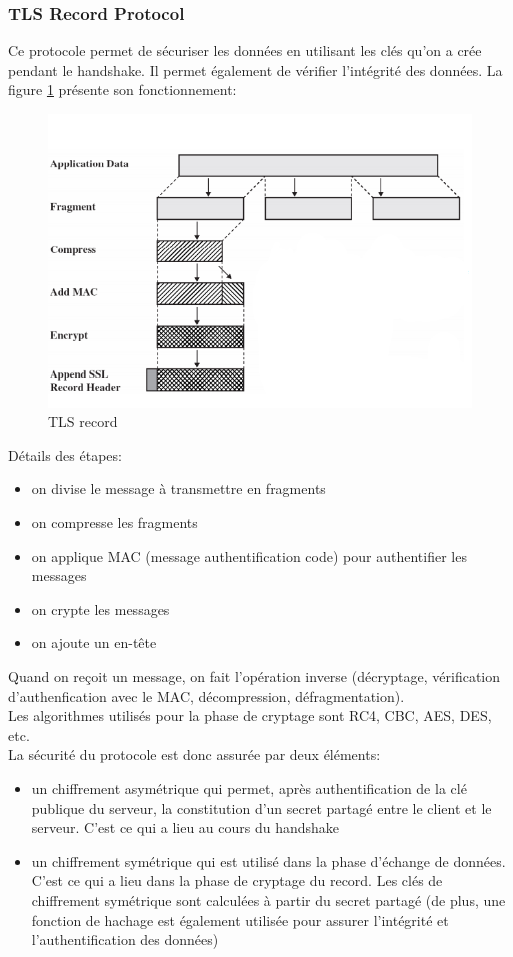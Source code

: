 \subsubsection{TLS Record Protocol}

Ce protocole permet de sécuriser les données en utilisant les clés qu'on a crée pendant le handshake. Il permet également de vérifier l'intégrité des données. La figure \ref{record} présente son fonctionnement:
\begin{figure}[H]
\centering
\includegraphics[scale=0.7]{img/tls-record.png}
\caption{TLS record}
\label{record}
\end{figure}

Détails des étapes:
\begin{itemize}
\item on divise le message à transmettre en fragments 
\item on compresse les fragments
\item on applique MAC (message authentification code) pour authentifier les messages 
\item on crypte les messages
\item on ajoute un en-t\^ete
\end{itemize}
Quand on reçoit un message, on fait l'opération inverse (décryptage, vérification d'authenfication avec le MAC, décompression, défragmentation). \\
Les algorithmes utilisés pour la phase de cryptage sont RC4, CBC, AES, DES, etc. \\

La sécurité du protocole est donc assurée par deux éléments:
\begin{itemize}
\item un chiffrement asymétrique qui permet, après authentification de la clé publique du serveur, la constitution d'un secret partagé entre le client et le serveur. C'est ce qui a lieu au cours du handshake
\item un chiffrement symétrique qui est utilisé dans la phase d'échange de données. C'est ce qui a lieu dans la phase de cryptage du record. Les clés de chiffrement symétrique sont calculées à partir du secret partagé (de plus, une fonction de hachage est également utilisée pour assurer l'intégrité et l'authentification des données)
\end{itemize}

